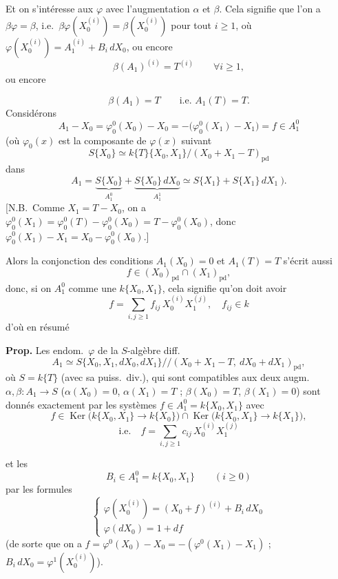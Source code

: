 \documentclass[11pt,a4paper]{article}
\begin{document}
Et on s'intéresse aux $\varphi$  \add{\ill{}} avec
l'augmentation $\alpha$ et $\beta$. Cela signifie que l'on a
$\beta\varphi = \beta$, i.e.\
$\beta\varphi(X_0^{(i)}) = \beta(X_0^{(i)})$ pour tout $i \geqslant 1$, où
$\varphi(X_0^{(i)}) = A_1^{(i)} + B_i\,dX_0$, ou encore
\[
  \beta(A_1)^{(i)} = T^{(i)} \qquad \forall i \geqslant 1 ,
\]
ou encore

\[
  \boxed{\beta(A_1) = T} \qquad \text{i.e. } A_1(T) = T .
\]
 Considérons 
\[
  A_1 - X_0 = \varphi^0_0(X_0) - X_0 = -\bigl(\varphi^0_0(X_1) - X_1\bigr) = f \in A_1^0
\]
(où $\varphi_0(x)$ est la composante de $\varphi(x)$ suivant
\[
  S\{X_0\} \simeq k\{T\}\{X_0, X_1\}/(X_0 + X_1 - T)_{\mathrm{pd}}
\]
dans
\[
  A_1 = \underbrace{S\{X_0\}}_{A_1^0} + \underbrace{S\{X_0\}\,dX_0}_{A_1^1}
      \simeq S\{X_1\} + S\{X_1\}\,dX_1 \ ).
\]
[N.B.\ Comme $X_1 = T - X_0$, on a
$\varphi^0_0(X_1) = \varphi^0_0(T) - \varphi^0_0(X_0) = T - \varphi^0_0(X_0)$,
donc $\varphi^0_0(X_1) - X_1 = X_0 - \varphi^0_0(X_0)$.]

Alors la conjonction des conditions $A_1(X_0) = 0$ et $A_1(T) = T$ s'écrit
aussi
\[
  f \in (X_0)_{\mathrm{pd}} \cap (X_1)_{\mathrm{pd}} ,
\]
donc, si on  $A_1^0$ comme une  $k\{X_0, X_1\}$, cela
signifie qu'on doit avoir
\[
  \boxed{f = \sum_{i, j \geqslant 1} f_{ij}\, X_0^{(i)} X_1^{(j)} , \quad f_{ij} \in k}
\]
d'où en résumé

\textbf{Prop.} Les endom.\ $\varphi$ de la $S$-algèbre diff.\
\[
  A_1 \simeq S\{X_0, X_1, dX_0, dX_1\}/\!/(X_0 + X_1 - T,\ dX_0 + dX_1)_{\mathrm{pd}} ,
\]
où $S = k\{T\}$ (avec sa puiss.\ div.), qui sont compatibles aux deux
augm.\ $\alpha, \beta : A_1 \to S$ ($\alpha(X_0) = 0$, $\alpha(X_1) = T$ ;
$\beta(X_0) = T$, $\beta(X_1) = 0$) sont donnés exactement par les systèmes
$f \in A_1^0 = k\{X_0, X_1\}$ avec
\[
  f \in \operatorname{Ker}\bigl(k\{X_0, X_1\} \to k\{X_0\}\bigr)
    \cap \operatorname{Ker}\bigl(k\{X_0, X_1\} \to k\{X_1\}\bigr) ,
\]
\[
  \text{i.e.}\quad \boxed{f = \sum_{i, j \geqslant 1} c_{ij}\, X_0^{(i)} X_1^{(j)}}
\]

et les
\[
  \boxed{B_i \in A_1^0 = k\{X_0, X_1\} \qquad (i \geqslant 0)}
\]
par les formules
\[
  \begin{cases}
    \varphi(X_0^{(i)}) = (X_0 + f)^{(i)} + B_i\,dX_0 \\
    \varphi(dX_0) = 1 + df
  \end{cases}
\]
(de sorte que on a $f = \varphi^0(X_0) - X_0 = -(\varphi^0(X_1) - X_1)$ ;
$B_i\,dX_0 = \varphi^1(X_0^{(i)})$).
\end{document}

